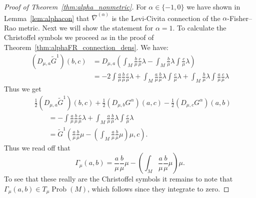 \documentclass[11pt,reqno]{amsart}
\theoremstyle{definition}
\newcommand{\dx}{\lambda}
\newcommand{\Prob}{\operatorname{Prob}(M)}
\newcommand{\nabar}{\overline{\nabla}^{(\alpha)}}
\begin{document}
\begin{proof}[Proof of Theorem~\ref{thm:alpha_nonmetric}]
For $\alpha\in \{-1,0\}$ we have shown in Lemma~\ref{lem:alphacon} that  $\nabar$ is the Levi-Civita connection of the $\alpha$-Fisher--Rao metric. Next we will show the statement for $\alpha=1$. To calculate the Christoffel symbols we proceed as in the proof of Theorem~\ref{thm:alphaFR_connection_dens}. We have:
\begin{align*}
\left(D_{\mu,a} \tilde G^{1}\right)(b,c)&=  
D_{\mu,a}\left(\int_M\frac{b}{\mu}\frac{c}{\mu}\dx -\int_M\frac{b}{\mu}\dx \int \frac{c}{\mu}\dx\right)
\\&=-2\int \frac{a}{\mu}\frac{b}{\mu}\frac{c}{\mu}\dx+\int_M\frac{a}{\mu}\frac{b}{\mu}\dx \int \frac{c}{\mu}\dx+\int_M\frac{b}{\mu}\dx \int \frac{a}{\mu}\frac{c}{\mu}\dx
\end{align*}
Thus we get 
\begin{align*}
&\frac12 \left(D_{\mu,a} \tilde G^{1}\right)(b,c)+\frac12\left(D_{\mu,b} G^{\alpha}\right)(a,c)-\frac12\left(D_{\mu,c} G^{\alpha}\right)(a,b)\\&\qquad=
-\int \frac{a}{\mu}\frac{b}{\mu}\frac{c}{\mu}\dx+\int_M\frac{a}{\mu}\frac{b}{\mu}\dx \int \frac{c}{\mu}\dx  \\
&\qquad=\tilde G^{1}\left(\frac{a}{\mu}\frac{b}{\mu}\mu-\left(\int_M \frac{a}{\mu}\frac{b}{\mu}\mu\right)\mu,c\right).
\end{align*}
Thus we read off that 
\begin{equation*}
\Gamma_{\mu}(a,b)=\frac{a}{\mu}\frac{b}{\mu}\mu-\left(\int_M \frac{a}{\mu}\frac{b}{\mu}\mu\right)\mu.
\end{equation*}
To see that these really are the Christoffel symbols it remains to note that $\Gamma_{\mu}(a,b)\in T_{\mu}\Prob$, which follows since they integrate to zero. 


\end{proof}
\end{document}
